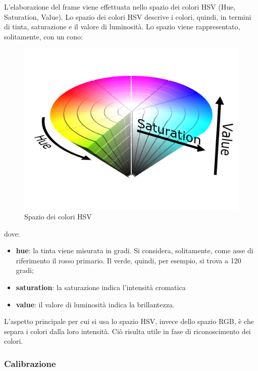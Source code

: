 \documentclass[a4paper,12pt,italian]{article}
\begin{document}
L'elaborazione del frame viene effettuata nello spazio dei colori HSV (Hue, Saturation, Value).
Lo spazio dei colori HSV descrive i colori, quindi, in termini di tinta, saturazione e il valore di luminosità. Lo spazio viene rappresentato, solitamente, con un cono:

\begin{figure}[H]
	\begin{center}
	\includegraphics[scale=0.08]{HSV.png}
	\caption{Spazio dei colori HSV}
	\label{Fig: movimento_3}
	\end{center}
\end{figure}

dove:

\begin{itemize}
	\item \textbf{hue}: la tinta viene misurata in gradi. Si considera, solitamente, come asse di riferimento il rosso primario. Il verde, quindi, per esempio, si trova a 120 gradi;
	\item \textbf{saturation}: la saturazione indica l'intensità cromatica
	\item \textbf{value}: il valore di luminosità indica la brillantezza.
\end{itemize}

L'aspetto principale per cui si usa lo spazio HSV, invece dello spazio RGB, è che separa i colori dalla loro intensità. Ciò risulta utile in fase di riconoscimento dei colori.

\subsubsection{Calibrazione}
\end{document}
